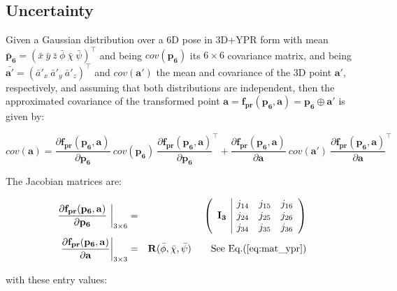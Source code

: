 \documentclass[a4paper,11pt]{report}
\begin{document}
\subsection{Uncertainty}

Given a Gaussian distribution over a 6D pose in 3D+YPR form with
mean ${\mathbf{\bar{p}_6}= (\bar x ~\bar y ~\bar z ~ \bar\phi ~ \bar\chi ~ \bar\psi)^\top}$ and being $cov(\mathbf{p_6})$ its $6 \times 6$ covariance matrix,
and being ${\mathbf{\bar{a'}} = (\bar a'_x ~\bar a'_y ~\bar a'_z )^\top }$ and $cov(\mathbf{a'})$ the mean and covariance of the 3D point
$\mathbf{a'}$, respectively, and assuming that both distributions are independent,
then the approximated covariance of the transformed point
$\mathbf{a} = \mathbf{f_{pr}} (\mathbf{p_6},\mathbf{a}) = \mathbf{p_6} \oplus \mathbf{a'}$ is given by:

\begin{equation}
cov(\mathbf{a}) =
\frac{\partial \mathbf{f_{pr}} (\mathbf{p_6},\mathbf{a})}{\partial \mathbf{p_6}} ~
cov(\mathbf{p_6})  ~
\frac{\partial \mathbf{f_{pr}} (\mathbf{p_6},\mathbf{a})}{\partial \mathbf{p_6}}^\top
+
\frac{\partial \mathbf{f_{pr}} (\mathbf{p_6},\mathbf{a})}{\partial \mathbf{a}} ~
cov(\mathbf{a'})  ~
\frac{\partial \mathbf{f_{pr}} (\mathbf{p_6},\mathbf{a})}{\partial \mathbf{a}}^\top
\end{equation}


The Jacobian matrices are:


\begin{eqnarray}
\left. \frac{\partial \mathbf{f_{pr}} (\mathbf{p_6},\mathbf{a})}{\partial \mathbf{p_6}} ~
\right|_{3 \times 6}
&=&
\left(
\begin{array}{c|ccc}
~            & j_{14} & j_{15} & j_{16} \\
\mathbf{I_3} & j_{24} & j_{25} & j_{26} \\
~            & j_{34} & j_{35} & j_{36}
\end{array}
\right)
\\
\left.\frac{\partial \mathbf{f_{pr}} (\mathbf{p_6},\mathbf{a})}{\partial \mathbf{a}}
\right|_{3 \times 3}
&=&
\mathbf{R}(\bar\phi,\bar\chi,\bar\psi) \quad\quad \text{See Eq.(\ref{eq:mat_ypr})}
\end{eqnarray}

\noindent with these entry values:
\end{document}
